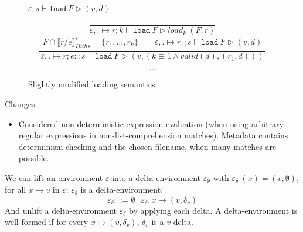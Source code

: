 \documentclass[10pt,twoside,a4paper]{article}
\theoremstyle{theorem}
\theoremstyle{lemma}
\theoremstyle{property}
\begin{document}
\begin{figure}[t]
$\boxed{\varepsilon;s \vdash \mathtt{load}~ F \rhd (v,d)}$

\begin{displaymath}
	\frac{}
	{\varepsilon,. \mapsto r;k \vdash \mathtt{load}~ F \rhd {load}_{k}~(F,r)}
\end{displaymath}
\begin{displaymath}
	\frac{\begin{array}{c}
		F \cap \llbracket r/e \rrbracket^{\varepsilon}_{Paths} = \{r_1,\dots,r_k\}  \quad
		\quad \varepsilon,. \mapsto r_1;s \vdash \mathtt{load}~ F \rhd (v,d)
	\end{array}}
	{\varepsilon,. \mapsto r;e :: s \vdash \mathtt{load}~ F \rhd (v,(k \equiv 1 \wedge valid(d),(r_1,d))) }
\end{displaymath}

\begin{displaymath}
	\dots
\end{displaymath}

\caption{Slightly modified loading semantics.}
\end{figure}

Changes:
\begin{itemize}
	\item Considered non-deterministic expression evaluation (when using arbitrary regular expressions in non-list-comprehension matches). Metadata contains determinism checking and the chosen filename, when many matches are possible.
\end{itemize}


We can lift an environment $\varepsilon$ into a delta-environment $\varepsilon_\emptyset$ with $\varepsilon_\delta~(x) = (v,\emptyset)$, for all $x \mapsto v$ in $\varepsilon$:
$\varepsilon_\delta$ is a delta-environment:
\begin{displaymath}
	\varepsilon_\delta ::= \emptyset ~|~ \varepsilon_\delta,x \mapsto (v,\delta_v)
\end{displaymath}
And unlift a delta-environment $\varepsilon_\delta$ by applying each delta. A delta-environment is well-formed if for every $x \mapsto (v,\delta_v)$, $\delta_v$ is a $v$-delta.
\end{document}
